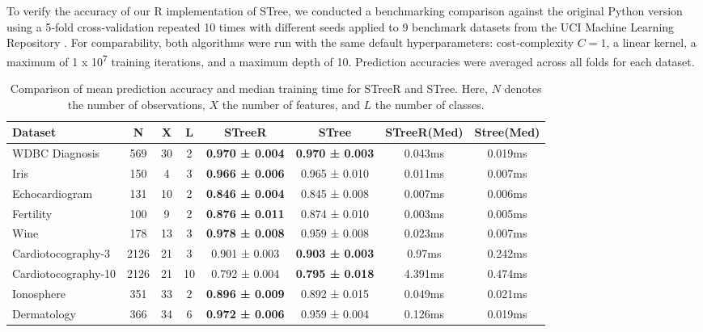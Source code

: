 To verify the accuracy of our R implementation of STree, we conducted a benchmarking comparison against the original Python version using a 5‑fold cross‑validation repeated 10 times with different seeds applied to 9 benchmark datasets from the UCI Machine Learning Repository \citep{kelly2023uci}. For comparability, both algorithms were run with the same default hyperparameters: cost‑complexity \(C=1\), a linear kernel, a maximum of 1 x 10\textsuperscript{7} training iterations, and a maximum depth of 10. Prediction accuracies were averaged across all folds for each dataset.

\begin{table}
\centering
\caption{\label{tab:table-benchmark-streer-latex}Comparison of mean prediction accuracy and median training time for STreeR and STree. Here, \(N\) denotes the number of observations, \(X\) the number of features, and \(L\) the number of classes.}
\centering
\fontsize{8}{10}\selectfont
\begin{tabular}[t]{l|c|c|c|c|c|c|c}
\hline
Dataset & N & X & L & STreeR & STree & STreeR(Med) & Stree(Med)\\
\hline
WDBC Diagnosis & 569 & 30 & 2 & \textbf{0.970 ± 0.004} & \textbf{0.970 ± 0.003} & 0.043ms & 0.019ms\\
\hline
Iris & 150 & 4 & 3 & \textbf{0.966 ± 0.006} & 0.965 ± 0.010 & 0.011ms & 0.007ms\\
\hline
Echocardiogram & 131 & 10 & 2 & \textbf{0.846 ± 0.004} & 0.845 ± 0.008 & 0.007ms & 0.006ms\\
\hline
Fertility & 100 & 9 & 2 & \textbf{0.876 ± 0.011} & 0.874 ± 0.010 & 0.003ms & 0.005ms\\
\hline
Wine & 178 & 13 & 3 & \textbf{0.978 ± 0.008} & 0.959 ± 0.008 & 0.023ms & 0.007ms\\
\hline
Cardiotocography-3 & 2126 & 21 & 3 & 0.901 ± 0.003 & \textbf{0.903 ± 0.003} & 0.97ms & 0.242ms\\
\hline
Cardiotocography-10 & 2126 & 21 & 10 & 0.792 ± 0.004 & \textbf{0.795 ± 0.018} & 4.391ms & 0.474ms\\
\hline
Ionosphere & 351 & 33 & 2 & \textbf{0.896 ± 0.009} & 0.892 ± 0.015 & 0.049ms & 0.021ms\\
\hline
Dermatology & 366 & 34 & 6 & \textbf{0.972 ± 0.006} & 0.959 ± 0.004 & 0.126ms & 0.019ms\\
\hline
\end{tabular}
\end{table}

